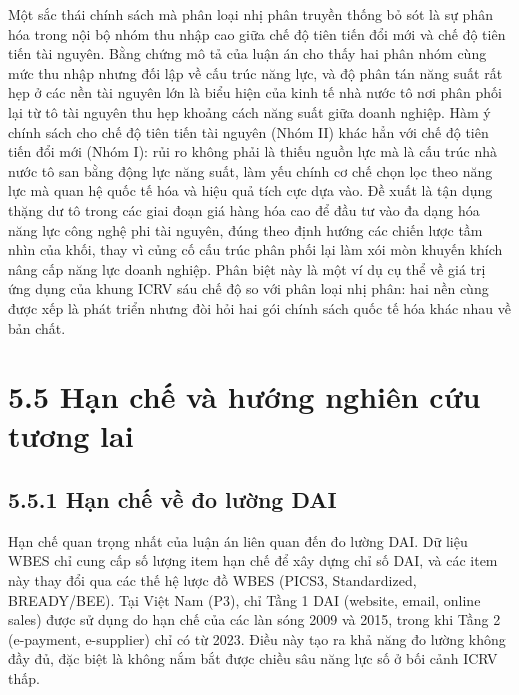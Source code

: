 \documentclass[
  a4paper,
  13pt]{extreport}
\begin{document}
Một sắc thái chính sách mà phân loại nhị phân truyền thống bỏ sót là sự
phân hóa trong nội bộ nhóm thu nhập cao giữa chế độ tiên tiến đổi mới và
chế độ tiên tiến tài nguyên. Bằng chứng mô tả của luận án cho thấy hai
phân nhóm cùng mức thu nhập nhưng đối lập về cấu trúc năng lực, và độ
phân tán năng suất rất hẹp ở các nền tài nguyên lớn là biểu hiện của
kinh tế nhà nước tô nơi phân phối lại từ tô tài nguyên thu hẹp khoảng
cách năng suất giữa doanh nghiệp. Hàm ý chính sách cho chế độ tiên tiến
tài nguyên (Nhóm II) khác hẳn với chế độ tiên tiến đổi mới (Nhóm I): rủi
ro không phải là thiếu nguồn lực mà là cấu trúc nhà nước tô san bằng
động lực năng suất, làm yếu chính cơ chế chọn lọc theo năng lực mà quan
hệ quốc tế hóa và hiệu quả tích cực dựa vào. Đề xuất là tận dụng thặng
dư tô trong các giai đoạn giá hàng hóa cao để đầu tư vào đa dạng hóa
năng lực công nghệ phi tài nguyên, đúng theo định hướng các chiến lược
tầm nhìn của khối, thay vì củng cố cấu trúc phân phối lại làm xói mòn
khuyến khích nâng cấp năng lực doanh nghiệp. Phân biệt này là một ví dụ
cụ thể về giá trị ứng dụng của khung ICRV sáu chế độ so với phân loại
nhị phân: hai nền cùng được xếp là phát triển nhưng đòi hỏi hai gói
chính sách quốc tế hóa khác nhau về bản chất.

\hypertarget{hux1ea1n-chux1ebf-vuxe0-hux1b0ux1edbng-nghiuxean-cux1ee9u-tux1b0ux1a1ng-lai}{%
\section{5.5 Hạn chế và hướng nghiên cứu tương
lai}\label{hux1ea1n-chux1ebf-vuxe0-hux1b0ux1edbng-nghiuxean-cux1ee9u-tux1b0ux1a1ng-lai}}

\hypertarget{hux1ea1n-chux1ebf-vux1ec1-ux111o-lux1b0ux1eddng-dai}{%
\subsection{5.5.1 Hạn chế về đo lường
DAI}\label{hux1ea1n-chux1ebf-vux1ec1-ux111o-lux1b0ux1eddng-dai}}

Hạn chế quan trọng nhất của luận án liên quan đến đo lường DAI. Dữ liệu
WBES chỉ cung cấp số lượng item hạn chế để xây dựng chỉ số DAI, và các
item này thay đổi qua các thế hệ lược đồ WBES (PICS3, Standardized,
BREADY/BEE). Tại Việt Nam (P3), chỉ Tầng 1 DAI (website, email, online
sales) được sử dụng do hạn chế của các làn sóng 2009 và 2015, trong khi
Tầng 2 (e-payment, e-supplier) chỉ có từ 2023. Điều này tạo ra khả năng
đo lường không đầy đủ, đặc biệt là không nắm bắt được chiều sâu năng lực
số ở bối cảnh ICRV thấp.
\end{document}
